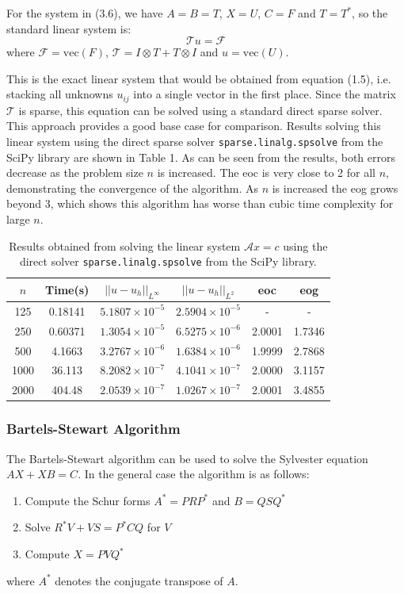 \documentclass{article}
\numberwithin{equation}{section}
\begin{document}
For the system in (3.6), we have $A=B=T$, $X=U$, $C=F$ and $T=T^*$, so the standard linear system is:
\begin{equation}
\mathcal{T}u = \mathcal{F}
\end{equation}
where $\mathcal{F} = \text{vec}(F)$, $\mathcal{T} = I \otimes T + T \otimes I$ and $u = \text{vec}(U)$. 

This is the exact linear system that would be obtained from equation (1.5), i.e. stacking all unknowns $u_{ij}$ into a single vector in the first place. Since the matrix $\mathcal{T}$ is sparse, this equation can be solved using a standard direct sparse solver. This approach provides a good base case for comparison. Results solving this linear system using the direct sparse solver \texttt{sparse.linalg.spsolve} from the SciPy library are shown in Table 1. As can be seen from the results, both errors decrease as the problem size $n$ is increased. The eoc is very close to 2 for all $n$, demonstrating the convergence of the algorithm. As $n$ is increased the eog grows beyond $3$, which shows this algorithm has worse than cubic time complexity for large $n$. 

\begin{table}[H]
\centering
\begin{tabular}{|c|c|c|c|c|c|}
\hline
$n$ & Time(s) & $|| u - u_h ||_{L^{\infty}}$ &$|| u - u_h ||_{L^{2}}$ & eoc & eog \\
\hline
125 & 0.18141 & $5.1807 \times 10^{-5}$ & $2.5904 \times 10^{-5}$ & - & - \\
250 & 0.60371 & $1.3054 \times 10^{-5}$ & $6.5275 \times 10^{-6}$ & 2.0001 & 1.7346 \\
500 & 4.1663 & $3.2767 \times 10^{-6}$ & $1.6384 \times 10^{-6}$ & 1.9999 & 2.7868 \\
1000 & 36.113 & $8.2082 \times 10^{-7}$ & $4.1041 \times 10^{-7}$ & 2.0000 & 3.1157 \\
2000 & 404.48 & $2.0539 \times 10^{-7}$ & $1.0267 \times 10^{-7}$ & 2.0001 & 3.4855 \\
\hline
\end{tabular}
\captionsetup{justification=centering}
\caption{Results obtained from solving the linear system $\mathcal{A} x = c$ using the direct solver  \texttt{sparse.linalg.spsolve} from the SciPy library.}
\end{table}

\subsubsection{Bartels-Stewart Algorithm}
The Bartels-Stewart algorithm \cite{Bartels} can be used to solve the Sylvester equation $AX + XB = C$. In the general case the algorithm is as follows:
\begin{enumerate}
\item Compute the Schur forms $A^* = PRP^*$ and $B=QSQ^*$
\item Solve $R^*V + VS = P^*CQ$ for $V$
\item Compute $X=PVQ^*$
\end{enumerate}
where $A^*$ denotes the conjugate transpose of $A$.
\end{document}
